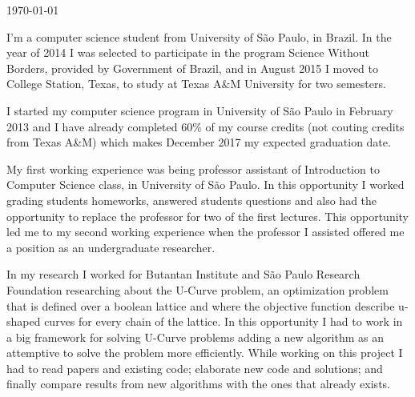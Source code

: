 \documentclass[11pt, a4paper]{awesome-cv}
\begin{document}
\makecvheader

\makecvfooter
  {\today}
  {}
  {}



\begin{cvletter}
\par I'm a computer science student from University of São Paulo, in Brazil. In the year of 2014 I was selected to participate in the program Science Without Borders, provided by Government of Brazil, and in  August 2015 I moved to College Station, Texas, to study at Texas A\&M University for two semesters.
\par I started my computer science program in University of São Paulo in February 2013 and I have already completed 60\% of my course credits (not couting credits from Texas A\&M) which makes December 2017 my expected graduation date.

\par My first working experience  was being professor assistant of Introduction to Computer Science class, in University of São Paulo. In this opportunity I worked grading students homeworks, answered students questions and also had the opportunity to replace the professor for two of the first lectures. This opportunity led me to my second working experience when the professor I assisted offered me a position as an undergraduate researcher.
\par In my research I worked for Butantan Institute and São Paulo Research Foundation researching about the U-Curve problem, an optimization problem that is defined over a boolean lattice and where the objective function describe u-shaped curves for every chain of the lattice. In this opportunity I had to work in a big framework for solving U-Curve problems adding a new algorithm as an attemptive to solve the problem more efficiently. While working on this project I had to read papers and existing code; elaborate new code and solutions; and finally compare results from new algorithms with the ones that already exists.


\end{cvletter}
\end{document}
